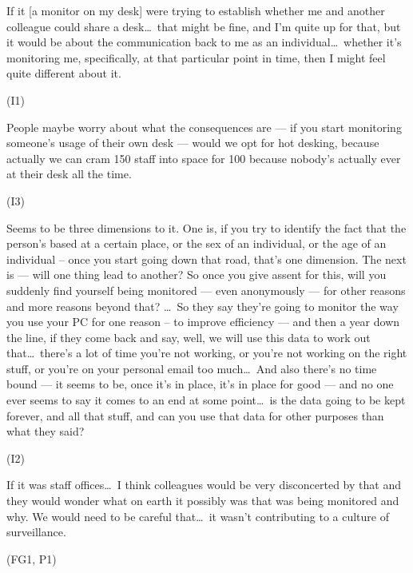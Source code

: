 \begin{qt}If it [a monitor on my desk] were trying to establish whether me and
another colleague could share a desk\ldots\  that might be fine, and I’m quite
up for that, but it would be about the communication back to me as an
individual\ldots\  whether it’s monitoring me, specifically, at that
particular point in time, then I might feel quite different about it.\end{qt} (I1)

\begin{qt}People maybe worry about what the
consequences are –-- if you start monitoring someone’s usage of their
own desk --– would we opt
for hot desking, because actually we can cram 150 staff into space for
100 because nobody’s actually ever at their desk all the time.\end{qt} (I3)

\begin{qt}Seems to be three dimensions to it. One is, if you try to identify the fact that the person’s
based at a certain place, or the sex of an individual, or the age of
an individual – once you start going down that road, that’s one
dimension. The next is --– will one thing lead to another? So once you
give assent for this, will you suddenly find yourself being monitored
--– even anonymously --– for other reasons and more reasons beyond that? \ldots\  
So they say they’re going to monitor the way you use your PC for one
reason – to improve efficiency –-- and then a year down the line, if
they come back and say, well, we will use this data to work out
that\ldots\  there’s a lot of time you’re not working, or you’re not working
on the right stuff, or you’re on your personal email too much\ldots\  And also there’s no time bound --– it
seems to be, once it’s in place, it’s in place for good –-- and no one
ever seems to say it comes to an end at some point\ldots\  is the data going
to be kept forever, and all that stuff, and can you use that data for
other purposes than what they said?\end{qt} (I2)

\begin{qt}If it was staff offices\ldots\  I think colleagues would be
  very disconcerted by that and they would wonder what on earth it
  possibly was that was being monitored and why. We would need to be
  careful that\ldots\  it wasn’t contributing to a culture of
  surveillance.
\end{qt}
(FG1, P1)

